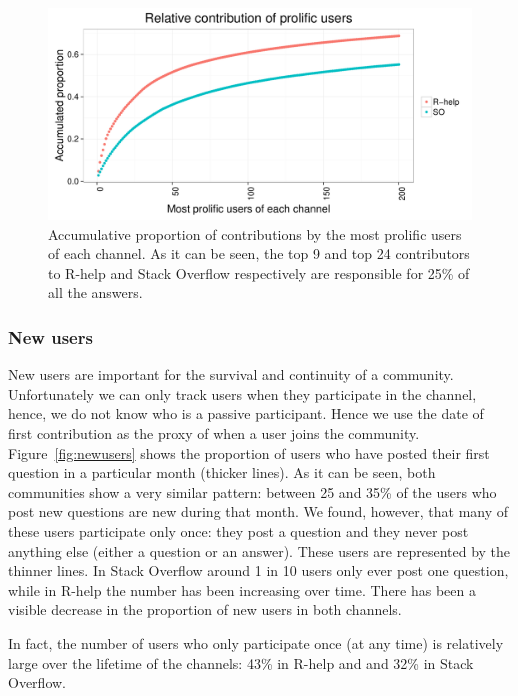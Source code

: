\documentclass[smallextended]{svjour3}       %
\newcommand{\SO}{Stack Overflow\xspace}
\newcommand{\RH}{R-help\xspace}
\begin{document}
\begin{figure}[htbp]
  \centering
  \includegraphics[width=.95\textwidth]{figs/prolific.pdf}
  \caption{Accumulative proportion of contributions by the most prolific users of each channel. As it can be seen, the
    top 9 and top 24
    contributors to \RH and \SO respectively  are responsible for 25\% of all the answers.}
  \label{fig:prolific}
\end{figure}

\subsubsection{New users}

New users are important for the survival and continuity of a community. Unfortunately we can only track users when they
participate in the channel, hence, we do not know who is a passive participant. Hence we use the date of first
contribution as the proxy of when a user joins the community.  Figure~\ref{fig:newusers} shows the proportion of users
who have posted their first question in a particular month (thicker lines). As it can be seen, both communities show a
very similar pattern: between 25 and 35\% of the users who post new questions are new during that month. We found,
however, that many of these users participate only once: they post a question and they never post anything else (either
a question or an answer). These users are represented by the thinner lines. In \SO around 1 in 10 users only ever post
one question, while in \RH the number has been increasing over time. There has been a visible decrease in the proportion
of new users in both channels. 

In fact, the number of users who only participate once (at any time) is relatively large over the lifetime of the channels: 43\% in
\RH and and 32\% in \SO.
\end{document}
